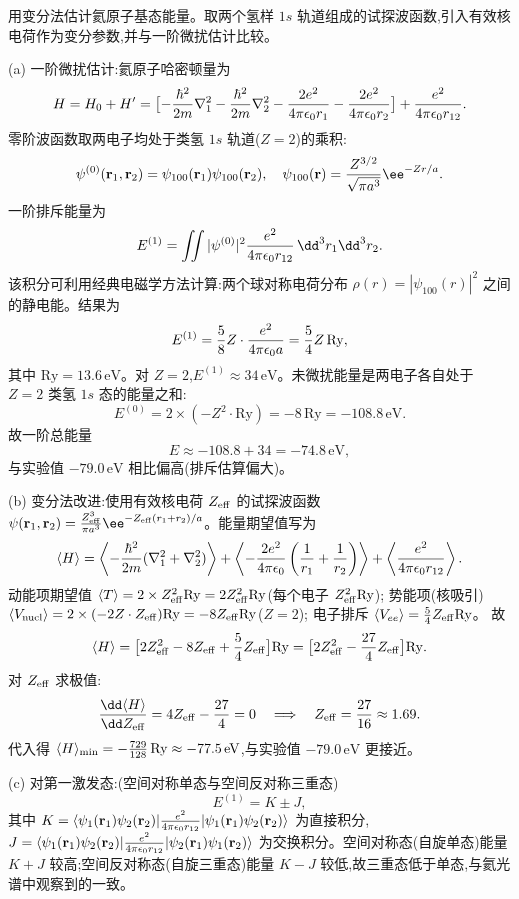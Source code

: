 \begin{question}
用变分法估计氦原子基态能量。取两个氢样 $1s$ 轨道组成的试探波函数,引入有效核电荷作为变分参数,并与一阶微扰估计比较。
\begin{solution}
(a) 一阶微扰估计:氦原子哈密顿量为
\[
H = H_0 + H' = \bigl[ -{\hbar^2\over2m}\nabla_1^2 - {\hbar^2\over2m}\nabla_2^2 - {2e^2\over4\pi\epsilon_0 r_1} - {2e^2\over4\pi\epsilon_0 r_2} \bigr] + {e^2\over4\pi\epsilon_0 r_{12}}.
\]
零阶波函数取两电子均处于类氢 $1s$ 轨道($Z=2$)的乘积:
\[
\psi^{(0)}(\mathbf r_1,\mathbf r_2) = \psi_{100}(\mathbf r_1)\psi_{100}(\mathbf r_2),
\quad \psi_{100}(\mathbf r) = {Z^{3/2}\over\sqrt{\pi a^3}}\ee^{-Zr/a}.
\]
一阶排斥能量为
\[
E^{(1)} = \iint |\psi^{(0)}|^2 {e^2\over4\pi\epsilon_0 r_{12}}\,\dd^3r_1\dd^3r_2.
\]
该积分可利用经典电磁学方法计算:两个球对称电荷分布 $\rho(r)=|\psi_{100}(r)|^2$ 之间的静电能。结果为
\[
E^{(1)} = {5\over8}Z\cdot{e^2\over4\pi\epsilon_0 a} = {5\over4}Z\,\mathrm{Ry},
\]
其中 $\mathrm{Ry}=13.6\,\mathrm{eV}$。对 $Z=2$,$E^{(1)}\approx34\,\mathrm{eV}$。未微扰能量是两电子各自处于 $Z=2$ 类氢 $1s$ 态的能量之和:
\[
E^{(0)} = 2\times\left(-Z^2\cdot{\mathrm{Ry}}\right) = -8\,\mathrm{Ry} = -108.8\,\mathrm{eV}.
\]
故一阶总能量
\[
E \approx -108.8 + 34 = -74.8\,\mathrm{eV},
\]
与实验值 $-79.0\,\mathrm{eV}$ 相比偏高(排斥估算偏大)。

(b) 变分法改进:使用有效核电荷 $Z_{\rm eff}$ 的试探波函数 $\psi(\mathbf r_1,\mathbf r_2) = {Z_{\rm eff}^3\over\pi a^3}\ee^{-Z_{\rm eff}(r_1+r_2)/a}$。能量期望值写为
\[
\langle H\rangle = \left\langle -{\hbar^2\over2m}(\nabla_1^2+\nabla_2^2)\right\rangle
+ \left\langle -{2e^2\over4\pi\epsilon_0}\left({1\over r_1}+{1\over r_2}\right)\right\rangle
+ \left\langle {e^2\over4\pi\epsilon_0 r_{12}}\right\rangle.
\]
动能项期望值 $\langle T\rangle = 2\times Z_{\rm eff}^2\mathrm{Ry} = 2Z_{\rm eff}^2\mathrm{Ry}$(每个电子 $Z_{\rm eff}^2\mathrm{Ry}$);
势能项(核吸引)$\langle V_{\rm nucl}\rangle = 2\times(-2Z\cdot Z_{\rm eff})\mathrm{Ry} = -8Z_{\rm eff}\mathrm{Ry}$($Z=2$);
电子排斥 $\langle V_{ee}\rangle = {5\over4}Z_{\rm eff}\mathrm{Ry}$。
故
\[
\langle H\rangle = \bigl[2Z_{\rm eff}^2 - 8Z_{\rm eff} + {5\over4}Z_{\rm eff}\bigr]\mathrm{Ry}
= \bigl[2Z_{\rm eff}^2 - {27\over4}Z_{\rm eff}\bigr]\mathrm{Ry}.
\]
对 $Z_{\rm eff}$ 求极值:
\[
{\dd\langle H\rangle\over\dd Z_{\rm eff}} = 4Z_{\rm eff} - {27\over4} = 0
\quad\Longrightarrow\quad Z_{\rm eff} = {27\over16} \approx 1.69.
\]
代入得 $\langle H\rangle_{\min} = -{729\over128}\,\mathrm{Ry} \approx -77.5\,\mathrm{eV}$,与实验值 $-79.0\,\mathrm{eV}$ 更接近。

(c) 对第一激发态:(空间对称单态与空间反对称三重态)
\[
E^{(1)} = K \pm J,
\]
其中 $K=\langle\psi_1(\mathbf r_1)\psi_2(\mathbf r_2)|{e^2\over4\pi\epsilon_0 r_{12}}|\psi_1(\mathbf r_1)\psi_2(\mathbf r_2)\rangle$ 为直接积分,$J=\langle\psi_1(\mathbf r_1)\psi_2(\mathbf r_2)|{e^2\over4\pi\epsilon_0 r_{12}}|\psi_2(\mathbf r_1)\psi_1(\mathbf r_2)\rangle$ 为交换积分。空间对称态(自旋单态)能量 $K+J$ 较高;空间反对称态(自旋三重态)能量 $K-J$ 较低,故三重态低于单态,与氦光谱中观察到的一致。
\end{solution}
\end{question}

